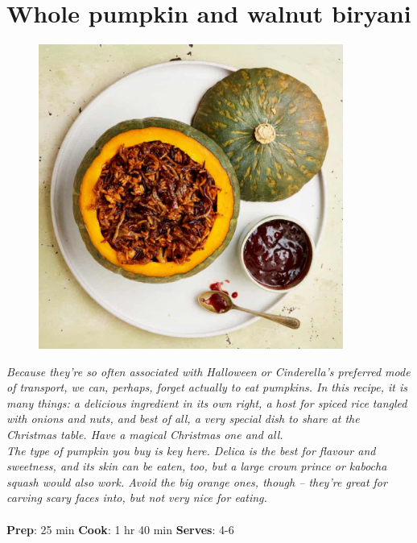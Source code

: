 \documentclass{book}
\begin{document}
\section{Whole pumpkin and walnut biryani}
\begin{figure}
\centering\includegraphics[width=10cm,height=10cm,keepaspectratio]{Recipe_Pictures/Whole_pumpkin_and_walnut_biryani.png}
\end{figure}
\emph{Because they’re so often associated with Halloween or Cinderella’s preferred mode of transport, we can, perhaps, forget actually to eat pumpkins. In this recipe, it is many things: a delicious ingredient in its own right, a host for spiced rice tangled with onions and nuts, and best of all, a very special dish to share at the Christmas table. Have a magical Christmas one and all.\\ 
The type of pumpkin you buy is key here. Delica is the best for flavour and sweetness, and its skin can be eaten, too, but a large crown prince or kabocha squash would also work. Avoid the big orange ones, though – they’re great for carving scary faces into, but not very nice for eating.}\\\\ 
\textbf{Prep}: 25 min
\textbf{Cook}: 1 hr 40 min
\textbf{Serves}: 4-6
\end{document}
